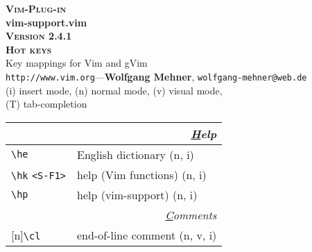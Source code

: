\documentclass[oneside,10pt,landscape,DIV16]{scrartcl}
\newcommand{\Pluginversion}{2.4.1}
\newcommand{\Rep}{{\scriptsize{[n]}}}
\begin{document}
%

\begin{multicols}{3}
%
\begin{center}
%
\textbf{\textsc{\small{Vim-Plug-in}}}\\
\textbf{\LARGE{vim-support.vim}}\\
\textbf{\textsc{\small{Version \Pluginversion}}}\\
\vspace{1mm}%
\textbf{\textsc{\Huge{Hot keys}}}\\ 
\vspace{1mm}%
Key mappings for Vim and gVim\\
{\tiny  \texttt{http://www.vim.org}\hspace{1.5mm}---\hspace{1.5mm}\textbf{Wolfgang Mehner},  \texttt{wolfgang-mehner@web.de}}\\
\vspace{1.0mm}
{\normalsize (i)} insert mode, {\normalsize (n)} normal mode, {\normalsize (v)} visual mode,\\
{\normalsize (T)} tab-completion
\vspace{1.0mm}
%
\begin{tabular}[]{|p{11mm}|p{58mm}|}
\hline 
\multicolumn{2}{|r|}{\textsl{\underline{H}elp}}\\[1.0ex]
\hline \verb'\he'                 & English dictionary   \hfill (n, i)\\
\hline \verb'\hk' \verb'<S-F1>'   & help (Vim functions) \hfill (n, i)\\
\hline \verb'\hp'                 & help (vim-support)   \hfill (n, i)\\
\hline 
\hline
\multicolumn{2}{|r|}{\textsl{\underline{C}omments}}                       \\[1.0ex]
\hline \Rep\verb'\cl'   & end-of-line comment               \hfill (n, v, i)\\

\end{tabular}
\end{center}
\end{multicols}
\end{document}
